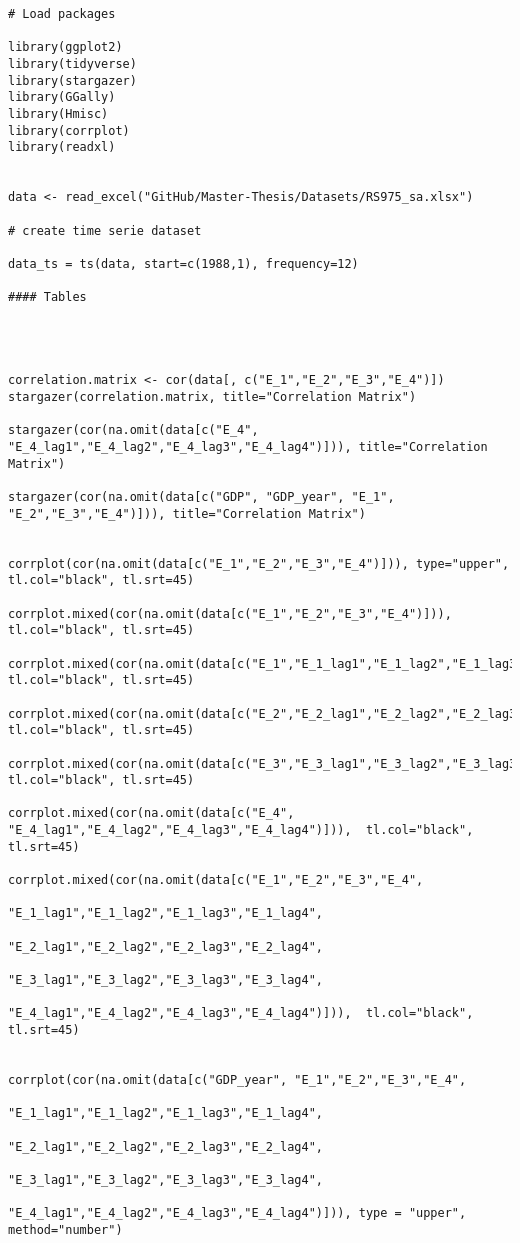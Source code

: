 
\begin{lstlisting}



# Load packages

library(ggplot2)
library(tidyverse)
library(stargazer)
library(GGally)
library(Hmisc)
library(corrplot)
library(readxl)


data <- read_excel("GitHub/Master-Thesis/Datasets/RS975_sa.xlsx")

# create time serie dataset

data_ts = ts(data, start=c(1988,1), frequency=12)

#### Tables




correlation.matrix <- cor(data[, c("E_1","E_2","E_3","E_4")])
stargazer(correlation.matrix, title="Correlation Matrix")

stargazer(cor(na.omit(data[c("E_4", "E_4_lag1","E_4_lag2","E_4_lag3","E_4_lag4")])), title="Correlation Matrix")

stargazer(cor(na.omit(data[c("GDP", "GDP_year", "E_1", "E_2","E_3","E_4")])), title="Correlation Matrix")


corrplot(cor(na.omit(data[c("E_1","E_2","E_3","E_4")])), type="upper", tl.col="black", tl.srt=45)

corrplot.mixed(cor(na.omit(data[c("E_1","E_2","E_3","E_4")])),  tl.col="black", tl.srt=45)

corrplot.mixed(cor(na.omit(data[c("E_1","E_1_lag1","E_1_lag2","E_1_lag3","E_1_lag4")])),  tl.col="black", tl.srt=45)

corrplot.mixed(cor(na.omit(data[c("E_2","E_2_lag1","E_2_lag2","E_2_lag3","E_2_lag4")])),  tl.col="black", tl.srt=45)

corrplot.mixed(cor(na.omit(data[c("E_3","E_3_lag1","E_3_lag2","E_3_lag3","E_3_lag4")])),  tl.col="black", tl.srt=45)

corrplot.mixed(cor(na.omit(data[c("E_4", "E_4_lag1","E_4_lag2","E_4_lag3","E_4_lag4")])),  tl.col="black", tl.srt=45)

corrplot.mixed(cor(na.omit(data[c("E_1","E_2","E_3","E_4",
                                  "E_1_lag1","E_1_lag2","E_1_lag3","E_1_lag4",
                                  "E_2_lag1","E_2_lag2","E_2_lag3","E_2_lag4",
                                  "E_3_lag1","E_3_lag2","E_3_lag3","E_3_lag4",
                                  "E_4_lag1","E_4_lag2","E_4_lag3","E_4_lag4")])),  tl.col="black", tl.srt=45)


corrplot(cor(na.omit(data[c("GDP_year", "E_1","E_2","E_3","E_4",
                                  "E_1_lag1","E_1_lag2","E_1_lag3","E_1_lag4",
                                  "E_2_lag1","E_2_lag2","E_2_lag3","E_2_lag4",
                                  "E_3_lag1","E_3_lag2","E_3_lag3","E_3_lag4",
                                  "E_4_lag1","E_4_lag2","E_4_lag3","E_4_lag4")])), type = "upper", method="number")


\end{lstlisting}
